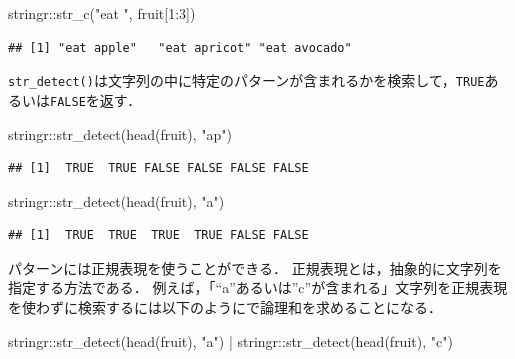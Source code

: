 \documentclass[
]{article}
\newenvironment{Shaded}{\begin{snugshade}}{\end{snugshade}}
\newcommand{\DecValTok}[1]{\textcolor[rgb]{0.00,0.00,0.81}{#1}}
\newcommand{\FunctionTok}[1]{\textcolor[rgb]{0.00,0.00,0.00}{#1}}
\newcommand{\NormalTok}[1]{#1}
\newcommand{\SpecialCharTok}[1]{\textcolor[rgb]{0.00,0.00,0.00}{#1}}
\newcommand{\StringTok}[1]{\textcolor[rgb]{0.31,0.60,0.02}{#1}}
\begin{document}
\begin{Shaded}
\begin{Highlighting}[]
\NormalTok{stringr}\SpecialCharTok{::}\FunctionTok{str\_c}\NormalTok{(}\StringTok{"eat "}\NormalTok{, fruit[}\DecValTok{1}\SpecialCharTok{:}\DecValTok{3}\NormalTok{])}
\end{Highlighting}
\end{Shaded}

\begin{verbatim}
## [1] "eat apple"   "eat apricot" "eat avocado"
\end{verbatim}

\texttt{str\_detect()}は文字列の中に特定のパターンが含まれるかを検索して，\texttt{TRUE}あるいは\texttt{FALSE}を返す．

\begin{Shaded}
\begin{Highlighting}[]
\NormalTok{stringr}\SpecialCharTok{::}\FunctionTok{str\_detect}\NormalTok{(}\FunctionTok{head}\NormalTok{(fruit), }\StringTok{"ap"}\NormalTok{)}
\end{Highlighting}
\end{Shaded}

\begin{verbatim}
## [1]  TRUE  TRUE FALSE FALSE FALSE FALSE
\end{verbatim}

\begin{Shaded}
\begin{Highlighting}[]
\NormalTok{stringr}\SpecialCharTok{::}\FunctionTok{str\_detect}\NormalTok{(}\FunctionTok{head}\NormalTok{(fruit), }\StringTok{"a"}\NormalTok{)}
\end{Highlighting}
\end{Shaded}

\begin{verbatim}
## [1]  TRUE  TRUE  TRUE  TRUE FALSE FALSE
\end{verbatim}

パターンには正規表現を使うことができる．
正規表現とは，抽象的に文字列を指定する方法である．
例えば，「``a''あるいは''c''が含まれる」文字列を正規表現を使わずに検索するには以下のように\texttt{\textbar{}}で論理和を求めることになる．

\begin{Shaded}
\begin{Highlighting}[]
\NormalTok{stringr}\SpecialCharTok{::}\FunctionTok{str\_detect}\NormalTok{(}\FunctionTok{head}\NormalTok{(fruit), }\StringTok{"a"}\NormalTok{) }\SpecialCharTok{|}\NormalTok{ stringr}\SpecialCharTok{::}\FunctionTok{str\_detect}\NormalTok{(}\FunctionTok{head}\NormalTok{(fruit), }\StringTok{"c"}\NormalTok{)}
\end{Highlighting}
\end{Shaded}
\end{document}
